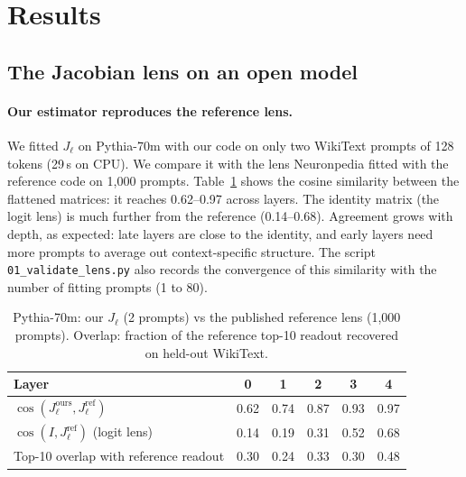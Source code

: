 \section{Results}

\subsection{The Jacobian lens on an open model}
\label{sec:lens}

\paragraph{Our estimator reproduces the reference lens.}
We fitted $J_\ell$ on Pythia-70m with our code on only two WikiText prompts of 128 tokens
(29\,s on CPU). We compare it with the lens Neuronpedia fitted with the reference code on
1{,}000 prompts. Table~\ref{tab:validate} shows the cosine similarity between the flattened
matrices: it reaches 0.62--0.97 across layers. The identity matrix (the logit lens) is much
further from the reference (0.14--0.68). Agreement grows with depth, as expected: late
layers are close to the identity, and early layers need more prompts to average out
context-specific structure. The script \texttt{01\_validate\_lens.py} also records the
convergence of this similarity with the number of fitting prompts (1 to 80).

\begin{table}[h]\centering\small
\caption{Pythia-70m: our $J_\ell$ (2 prompts) vs the published reference lens (1{,}000 prompts).
Overlap: fraction of the reference top-10 readout recovered on held-out WikiText.}
\label{tab:validate}
\begin{tabular}{lccccc}
\toprule
Layer & 0 & 1 & 2 & 3 & 4 \\
\midrule
$\cos(J^{\text{ours}}_\ell, J^{\text{ref}}_\ell)$ & 0.62 & 0.74 & 0.87 & 0.93 & 0.97 \\
$\cos(I, J^{\text{ref}}_\ell)$ (logit lens) & 0.14 & 0.19 & 0.31 & 0.52 & 0.68 \\
Top-10 overlap with reference readout & 0.30 & 0.24 & 0.33 & 0.30 & 0.48 \\
\bottomrule
\end{tabular}
\end{table}

